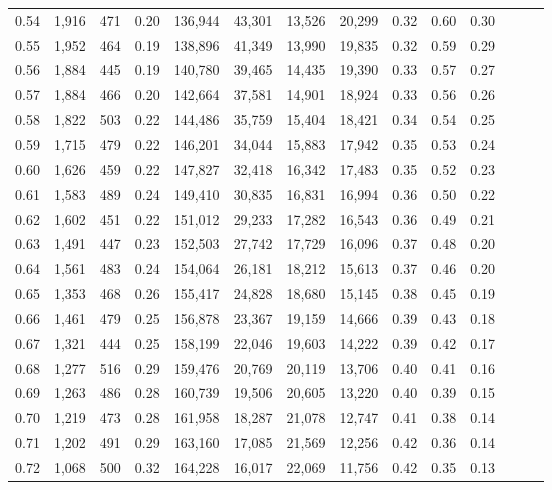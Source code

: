 \begin{tabular}{rrrrrrrrrrrrrr}
0.54 &  1,916 &  471 &  0.20 &  136,944 &   43,301 &  13,526 &  20,299 &  0.32 &  0.60 &      0.30 \\
0.55 &  1,952 &  464 &  0.19 &  138,896 &   41,349 &  13,990 &  19,835 &  0.32 &  0.59 &      0.29 \\
0.56 &  1,884 &  445 &  0.19 &  140,780 &   39,465 &  14,435 &  19,390 &  0.33 &  0.57 &      0.27 \\
0.57 &  1,884 &  466 &  0.20 &  142,664 &   37,581 &  14,901 &  18,924 &  0.33 &  0.56 &      0.26 \\
0.58 &  1,822 &  503 &  0.22 &  144,486 &   35,759 &  15,404 &  18,421 &  0.34 &  0.54 &      0.25 \\
0.59 &  1,715 &  479 &  0.22 &  146,201 &   34,044 &  15,883 &  17,942 &  0.35 &  0.53 &      0.24 \\
0.60 &  1,626 &  459 &  0.22 &  147,827 &   32,418 &  16,342 &  17,483 &  0.35 &  0.52 &      0.23 \\
0.61 &  1,583 &  489 &  0.24 &  149,410 &   30,835 &  16,831 &  16,994 &  0.36 &  0.50 &      0.22 \\
0.62 &  1,602 &  451 &  0.22 &  151,012 &   29,233 &  17,282 &  16,543 &  0.36 &  0.49 &      0.21 \\
0.63 &  1,491 &  447 &  0.23 &  152,503 &   27,742 &  17,729 &  16,096 &  0.37 &  0.48 &      0.20 \\
0.64 &  1,561 &  483 &  0.24 &  154,064 &   26,181 &  18,212 &  15,613 &  0.37 &  0.46 &      0.20 \\
0.65 &  1,353 &  468 &  0.26 &  155,417 &   24,828 &  18,680 &  15,145 &  0.38 &  0.45 &      0.19 \\
0.66 &  1,461 &  479 &  0.25 &  156,878 &   23,367 &  19,159 &  14,666 &  0.39 &  0.43 &      0.18 \\
0.67 &  1,321 &  444 &  0.25 &  158,199 &   22,046 &  19,603 &  14,222 &  0.39 &  0.42 &      0.17 \\
0.68 &  1,277 &  516 &  0.29 &  159,476 &   20,769 &  20,119 &  13,706 &  0.40 &  0.41 &      0.16 \\
0.69 &  1,263 &  486 &  0.28 &  160,739 &   19,506 &  20,605 &  13,220 &  0.40 &  0.39 &      0.15 \\
0.70 &  1,219 &  473 &  0.28 &  161,958 &   18,287 &  21,078 &  12,747 &  0.41 &  0.38 &      0.14 \\
0.71 &  1,202 &  491 &  0.29 &  163,160 &   17,085 &  21,569 &  12,256 &  0.42 &  0.36 &      0.14 \\
0.72 &  1,068 &  500 &  0.32 &  164,228 &   16,017 &  22,069 &  11,756 &  0.42 &  0.35 &      0.13 \\

\end{tabular}
